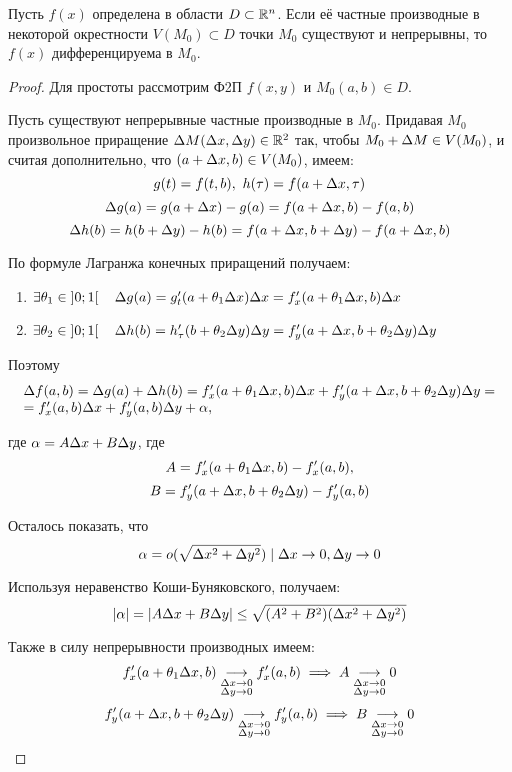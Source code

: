 \documentclass[../../main.tex]{subfiles}
\begin{document}
\begin{thm}
Пусть $f(x)$ определена в области $D \subset \mathbb{R}^n$. Если её
частные производные в некоторой окрестности $V(M_0)\subset D$ точки
$M_0$ существуют и непрерывны, то $f(x)$ дифференцируема в $M_0$.
\end{thm}
\begin{proof}
Для простоты рассмотрим Ф2П $f(x,y)$ и $M_0(a,b)\in D$.

Пусть существуют непрерывные частные производные в $M_0$. Придавая $M_0$ 
произвольное приращение $\Delta M(\Delta x,\Delta y)\in \mathbb{R}^2$ так, чтобы $M_0+\Delta M\in 
V(M_0)$, и считая дополнительно, что $(a+\Delta x,b)\in V(M_0)$, имеем:
\[ g(t)=f(t,b),\ h(\tau) = f(a+\Delta x,\tau) \]
\[ \Delta g(a)=g(a+\Delta x) -g(a) = f(a+\Delta x, b)-f(a,b) \]
\[ \Delta h(b)=h(b+\Delta y) -h(b) = f(a+\Delta x, b+\Delta y)-f(a+\Delta x,b) \]

По формуле Лагранжа конечных приращений получаем:
\begin{enumerate}
\item $ \exists \theta_1\in\left]0;1\right[\quad
\Delta g(a) = g'_t(a+\theta_1\Delta x)\Delta x=f'_x(a+\theta_1\Delta x,b)\Delta x $
\item $ \exists \theta_2\in\left]0;1\right[\quad
\Delta h(b) = h'_\tau(b+\theta_2\Delta y)\Delta y=f'_y(a+\Delta x, b+\theta_2\Delta y)\Delta y $
\end{enumerate}

Поэтому
\begin{equation}
\begin{array}{l}
\Delta f(a,b) = \Delta g(a) +\Delta h(b) = f'_x(a+\theta_1\Delta x,b)\Delta x+
f'_y(a+\Delta x, b+\theta_2\Delta y)\Delta y = \\
= f'_x(a,b)\Delta x +f'_y(a,b)\Delta y + \alpha,
\end{array}
\label{l5:diff}
\end{equation}

где $\alpha = A\Delta x+B\Delta y$, где
\[A = f'_x(a+\theta_1\Delta x,b)-f'_x(a,b),\]
\[B = f'_y(a+\Delta x, b+\theta_2\Delta y) - f'_y(a,b)\]

Осталось показать, что
\begin{equation}
\alpha = o(\sqrt{\Delta x^2 + \Delta y^2}) \mid \Delta x \to 0, \Delta y \to 0
\label{l5:alpha_o}
\end{equation}

Используя неравенство Коши-Буняковского, получаем:
\[\left|{\alpha}\right| = \left|{A\Delta x+B\Delta y}\right| \leq \sqrt{(A^2+B^2)(\Delta x^2+\Delta y^2)}\]

Также в силу непрерывности производных имеем:
\[f'_x(a+\theta_1\Delta x,b)\underset{\substack{\Delta x\to 0 \\
\Delta y \to 0}}\longrightarrow f'_x(a,b)
\implies A \underset{\substack{\Delta x\to 0 \\
\Delta y \to 0}}\longrightarrow 0\]
\[f'_y(a+\Delta x, b+\theta_2\Delta y) \underset{\substack{\Delta x\to 0 \\
\Delta y \to 0}}\longrightarrow f'_y(a,b)
\implies B \underset{\substack{\Delta x\to 0 \\\Delta y \to 0}}\longrightarrow 0\]


\end{proof}
\end{document}

